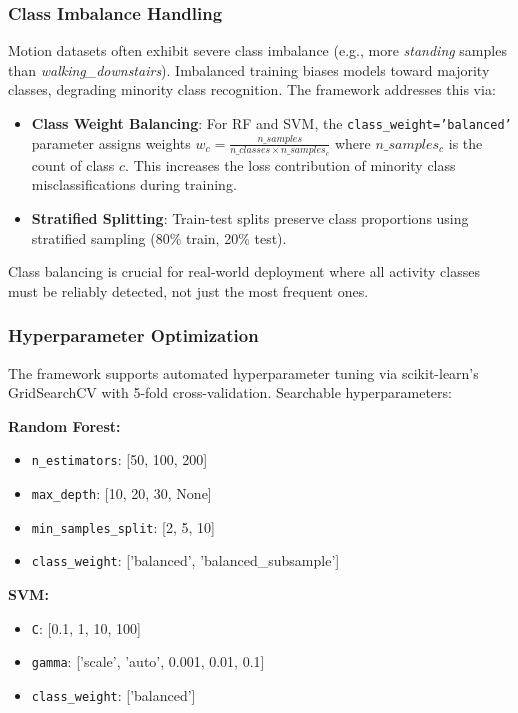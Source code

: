 \subsubsection{Class Imbalance Handling}
Motion datasets often exhibit severe class imbalance (e.g., more \textit{standing} samples than \textit{walking\_downstairs}). Imbalanced training biases models toward majority classes, degrading minority class recognition. The framework addresses this via:
\begin{itemize}
    \item \textbf{Class Weight Balancing}: For RF and SVM, the \texttt{class\_weight='balanced'} parameter assigns weights $w_c = \frac{n\_samples}{n\_classes \times n\_samples_c}$ where $n\_samples_c$ is the count of class $c$. This increases the loss contribution of minority class misclassifications during training.
    \item \textbf{Stratified Splitting}: Train-test splits preserve class proportions using stratified sampling (80\% train, 20\% test).
\end{itemize}
Class balancing is crucial for real-world deployment where all activity classes must be reliably detected, not just the most frequent ones.

\subsubsection{Hyperparameter Optimization}
The framework supports automated hyperparameter tuning via scikit-learn's GridSearchCV with 5-fold cross-validation. Searchable hyperparameters:

\textbf{Random Forest:}
\begin{itemize}
    \item \texttt{n\_estimators}: [50, 100, 200]
    \item \texttt{max\_depth}: [10, 20, 30, None]
    \item \texttt{min\_samples\_split}: [2, 5, 10]
    \item \texttt{class\_weight}: ['balanced', 'balanced\_subsample']
\end{itemize}

\textbf{SVM:}
\begin{itemize}
    \item \texttt{C}: [0.1, 1, 10, 100]
    \item \texttt{gamma}: ['scale', 'auto', 0.001, 0.01, 0.1]
    \item \texttt{class\_weight}: ['balanced']
\end{itemize}


